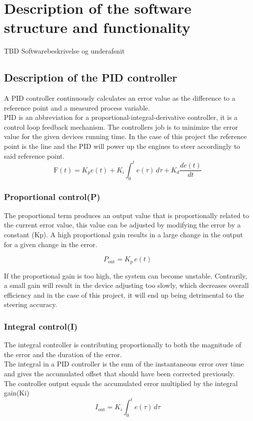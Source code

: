 \section{Description of the software structure and functionality}

TBD Softwarebeskrivelse og underafsnit

\subsection {Description of the PID controller} 
 
A PID controller continuously calculates an error value as the difference to a reference point and a measured process variable.\\
PID is an abbreviation for a proportional-integral-derivative controller, it is a control loop feedback mechanism. The controllers job is to minimize the error value for the given devices running time. In the case of this project the reference point is the line and the PID will power up the engines to steer accordingly to said reference point.
$$\mathrm{F}(t)=K_p{e(t)} + K_{i}\int_{0}^{t}{e(\tau)}\,{d\tau} + K_{d}\frac{de(t)}{dt}$$
\subsubsection {Proportional control(P)}

The proportional term produces an output value that is proportionally related to the current error value, this value can be adjusted by modifying the error by a constant (Kp). A high proportional gain results in a large change in the output for a given change in the error. 

$$ P_{\mathrm{out}}=K_p\,{e(t)}$$  

If the proportional gain is too high, the system can become unstable. Contrarily, a small gain will result in the device adjusting too slowly, which decreases overall efficiency and in the case of this project, it will end up being detrimental to the steering accuracy.
\subsubsection {Integral control(I)}

The integral controller is contributing proportionally to both the magnitude of the error and the duration of the error. \\
The integral in a PID controller is the sum of the instantaneous error over time and gives the accumulated offset that should have been corrected previously. \\
The controller output equals the accumulated error multiplied by the integral gain(Ki)
$$I_{\mathrm{out}}=K_{i}\int_{0}^{t}{e(\tau)}\,{d\tau} 	$$ 

